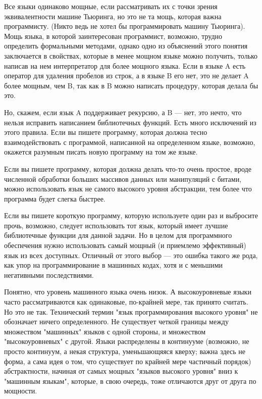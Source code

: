 \documentclass[ebook,12pt,oneside,openany]{memoir}
\begin{document}
Все языки одинаково мощные, если рассматривать их с точки зрения
эквивалентности машине Тьюринга, но это не та мощь, которая важна
программисту. (Никто ведь не хотел бы программировать машину
Тьюринга). Мощь языка, в которой заинтересован программист, возможно,
трудно определить формальными методами, однако одно из объяснений
этого понятия заключается в свойствах, которые в менее мощном языке
можно получить, только написав на нем интерпретатор для более мощного
языка. Если в языке A есть оператор для удаления пробелов из строк, а
в языке B его нет, это не делает A более мощным, чем B, так как в B
можно написать процедуру, которая делала бы это.

Но, скажем, если язык A поддерживает рекурсию, а B — нет, это нечто,
что нельзя исправить написанием библиотечных функций. Есть много
исключений из этого правила. Если вы пишете программу, которая должна
тесно взаимодействовать с программой, написанной на определенном
языке, возможно, окажется разумным писать новую программу на том же
языке.

Если вы пишете программу, которая должна делать что-то очень простое,
вроде численной обработки больших массивов данных или манипуляций с
битами, можно использовать язык не самого высокого уровня абстракции,
тем более что программа будет слегка быстрее.

Если вы пишете короткую программу, которую используете один раз и
выбросите прочь, возможно, следует использовать тот язык, который
имеет лучшие библиотечные функции для данной задачи. Но в целом для
программного обеспечения нужно использовать самый мощный (и приемлемо
эффективный) язык из всех доступных. Отличный от этого выбор — это
ошибка такого же рода, как упор на программирование в машинных кодах,
хотя и с меньшими негативными последствиями.

Понятно, что уровень машинного языка очень низок. А высокоуровневые
языки часто рассматриваются как одинаковые, по-крайней мере, так
принято считать. Но это не так. Технический термин "язык
программирования высокого уровня" не обозначает ничего определенного.
Не существует четкой границы между множеством "машинных" языков с
одной стороны, и множеством "высокоуровневых" с другой. Языки
распределены в континууме (возможно, не просто континуум, а некая
структура, уменьшающяяся кверху; важна здесь не форма, а сама идея о
том, что существует по крайней мере частичный порядок) абстрактности,
начиная от самых мощных "языков высокого уровня" вниз к "машинным
языкам", которые, в свою очередь, тоже отличаются друг от друга по
мощности.
\end{document}
